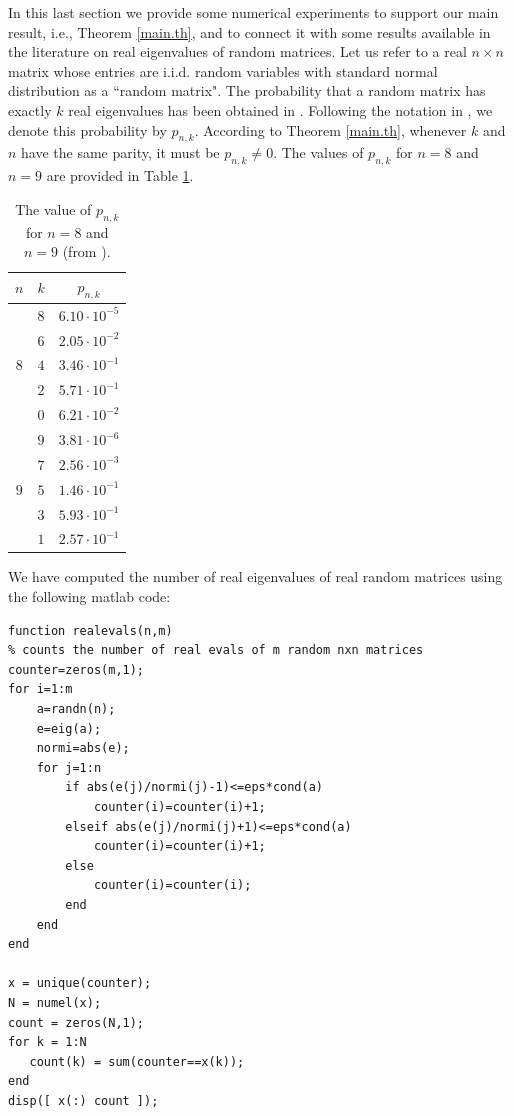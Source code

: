 \documentclass[a4paper]{article}
\makeatletter
\newenvironment{sol}%
{
\@parboxrestore%
\begin{lrbox}{\solbox}%
\begin{minipage}{0.8\linewidth}
}
{\end{minipage}\end{lrbox}%
\begin{center}
\framebox{\usebox\solbox}
\end{center}
}
\makeatother
\begin{document}
In this last section we provide some numerical experiments to support our main result, i.e., Theorem \ref{main.th}, and to connect it with some results available in the literature on real eigenvalues of random matrices. Let us refer to a real $n\times n$ matrix whose entries are i.i.d. random variables with standard normal distribution as a ``random matrix". The probability that a random matrix has exactly $k$ real eigenvalues has been obtained in \cite{edelman97}. Following the notation in \cite{edelman97}, we denote this probability by $p_{n,k}$. According to Theorem \ref{main.th}, whenever $k$ and $n$ have the same parity, it must be $p_{n,k}\neq0$. The values of $p_{n,k}$ for $n=8$ and $n=9$ are provided in Table \ref{pnk.table}.

\begin{table}[]
    \centering
    \begin{tabular}{|c|c|c|}\hline
    $n$&$k$&$p_{n,k}$\\\hline\hline
         \multirow{5}{1em}{$8$} & $8$ & $6.10\cdot10^{-5}$ \\
& $6$ & $2.05\cdot10^{-2}$ \\
& $4$ & $3.46\cdot10^{-1}$ \\&$2$ &$5.71\cdot10^{-1}$  \\
         &$0$& $6.21\cdot10^{-2}$\\\hline
         \multirow{5}{1em}{$9$} & $9$ & $3.81\cdot10^{-6}$ \\
& $7$ & $2.56\cdot10^{-3}$ \\
& $5$ & $1.46\cdot10^{-1}$ \\&$3$ &$5.93\cdot10^{-1}$  \\
         &$1$& $2.57\cdot10^{-1}$\\\hline
    \end{tabular}
    \caption{The value of $p_{n,k}$ for $n=8$ and $n=9$ (from \cite[Table 1]{edelman97}).}
    \label{pnk.table}
\end{table}

We have computed the number of real eigenvalues of real random matrices using the following {\sc matlab} code:

\begin{sol}
\begin{verbatim}
function realevals(n,m)
% counts the number of real evals of m random nxn matrices
counter=zeros(m,1);
for i=1:m
    a=randn(n);
    e=eig(a);
    normi=abs(e);
    for j=1:n
        if abs(e(j)/normi(j)-1)<=eps*cond(a)
            counter(i)=counter(i)+1;
        elseif abs(e(j)/normi(j)+1)<=eps*cond(a)
            counter(i)=counter(i)+1;
        else
            counter(i)=counter(i);
        end
    end
end

x = unique(counter);
N = numel(x);
count = zeros(N,1);
for k = 1:N
   count(k) = sum(counter==x(k));
end
disp([ x(:) count ]);
\end{verbatim}
\end{sol}
\end{document}
